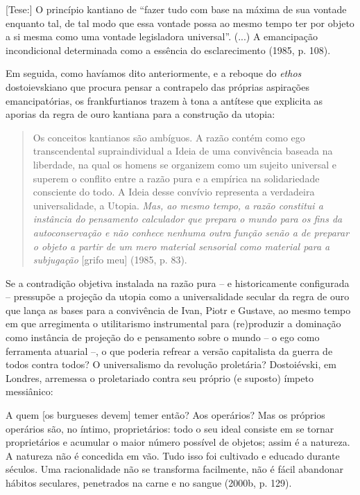 {[}Tese:{]} O princípio kantiano de ``fazer tudo com base na máxima de
sua vontade enquanto tal, de tal modo que essa vontade possa ao mesmo
tempo ter por objeto a si mesma como uma vontade legisladora
universal''. (...) A emancipação incondicional determinada como a
essência do esclarecimento (1985, p. 108).

Em seguida, como havíamos dito anteriormente, e a reboque do
\emph{ethos} dostoievskiano que procura pensar a contrapelo das próprias
aspirações emancipatórias, os frankfurtianos trazem à tona a antítese
que explicita as aporias da regra de ouro kantiana para a construção da
utopia:

\begin{quote}
Os conceitos kantianos são ambíguos. A razão contém como ego
transcendental supraindividual a Ideia de uma convivência baseada na
liberdade, na qual os homens se organizem como um sujeito universal e
superem o conflito entre a razão pura e a empírica na solidariedade
consciente do todo. A Ideia desse convívio representa a verdadeira
universalidade, a Utopia. \emph{Mas, ao mesmo tempo, a razão constitui a
instância do pensamento calculador que prepara o mundo para os fins da
autoconservação e não conhece nenhuma outra função senão a de preparar o
objeto a partir de um mero material sensorial como material para a
subjugação} {[}grifo meu{]} (1985, p. 83).
\end{quote}

Se a contradição objetiva instalada na razão pura -- e historicamente
configurada -- pressupõe a projeção da utopia como a universalidade
secular da regra de ouro que lança as bases para a convivência de Ivan,
Piotr e Gustave, ao mesmo tempo em que arregimenta o utilitarismo
instrumental para (re)produzir a dominação como instância de projeção do
e pensamento sobre o mundo -- o ego como ferramenta atuarial --, o que
poderia refrear a versão capitalista da guerra de todos contra todos? O
universalismo da revolução proletária? Dostoiévski, em Londres,
arremessa o proletariado contra seu próprio (e suposto) ímpeto
messiânico:

A quem {[}os burgueses devem{]} temer então? Aos operários? Mas os
próprios operários são, no íntimo, proprietários: todo o seu ideal
consiste em se tornar proprietários e acumular o maior número possível
de objetos; assim é a natureza. A natureza não é concedida em vão. Tudo
isso foi cultivado e educado durante séculos. Uma racionalidade não se
transforma facilmente, não é fácil abandonar hábitos seculares,
penetrados na carne e no sangue (2000b, p. 129).

